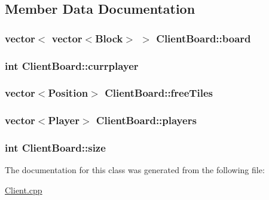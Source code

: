 \subsection{Member Data Documentation}
\hypertarget{classClientBoard_a7014b61049200cd5e271ffb4cda0f890}{
\subsubsection[{board}]{\setlength{\rightskip}{0pt plus 5cm}vector$<$ vector$<${\bf Block}$>$ $>$ Client\-Board\-::board}}\label{classClientBoard_a7014b61049200cd5e271ffb4cda0f890}
\hypertarget{classClientBoard_a1c82f70c45cae36e7c2c9d6a148c86a6}{
\subsubsection[{currplayer}]{\setlength{\rightskip}{0pt plus 5cm}int Client\-Board\-::currplayer}}\label{classClientBoard_a1c82f70c45cae36e7c2c9d6a148c86a6}
\hypertarget{classClientBoard_a11d9f78a2f2abd23b2da0983b4eac9b7}{
\subsubsection[{free\-Tiles}]{\setlength{\rightskip}{0pt plus 5cm}vector$<${\bf Position}$>$ Client\-Board\-::free\-Tiles}}\label{classClientBoard_a11d9f78a2f2abd23b2da0983b4eac9b7}
\hypertarget{classClientBoard_a1c232f1a961f552d95a1db54d90dc432}{
\subsubsection[{players}]{\setlength{\rightskip}{0pt plus 5cm}vector$<${\bf Player}$>$ Client\-Board\-::players}}\label{classClientBoard_a1c232f1a961f552d95a1db54d90dc432}
\hypertarget{classClientBoard_a57e4ae5f47ccbaeed3e32e18e9b259de}{
\subsubsection[{size}]{\setlength{\rightskip}{0pt plus 5cm}int Client\-Board\-::size}}\label{classClientBoard_a57e4ae5f47ccbaeed3e32e18e9b259de}


The documentation for this class was generated from the following file\-:\begin{DoxyCompactItemize}
\item 
\hyperlink{Client_8cpp}{Client.\-cpp}\end{DoxyCompactItemize}
